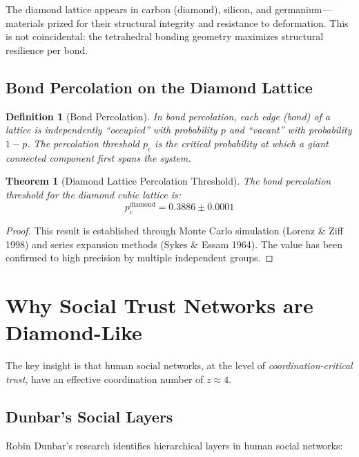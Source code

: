 \documentclass[11pt]{article}
\newtheorem{theorem}{Theorem}
\newtheorem{definition}{Definition}
\begin{document}
The diamond lattice appears in carbon (diamond), silicon, and germanium---materials prized for their structural integrity and resistance to deformation. This is not coincidental: the tetrahedral bonding geometry maximizes structural resilience per bond.

\subsection{Bond Percolation on the Diamond Lattice}

\begin{definition}[Bond Percolation]
In bond percolation, each edge (bond) of a lattice is independently ``occupied'' with probability $p$ and ``vacant'' with probability $1-p$. The percolation threshold $p_c$ is the critical probability at which a giant connected component first spans the system.
\end{definition}

\begin{theorem}[Diamond Lattice Percolation Threshold]
The bond percolation threshold for the diamond cubic lattice is:
\begin{equation}
\boxed{p_c^{\text{diamond}} = 0.3886 \pm 0.0001}
\end{equation}
\end{theorem}

\begin{proof}
This result is established through Monte Carlo simulation (Lorenz \& Ziff 1998) and series expansion methods (Sykes \& Essam 1964). The value has been confirmed to high precision by multiple independent groups.
\end{proof}

\section{Why Social Trust Networks are Diamond-Like}

The key insight is that human social networks, at the level of \emph{coordination-critical trust}, have an effective coordination number of $z \approx 4$.

\subsection{Dunbar's Social Layers}

Robin Dunbar's research identifies hierarchical layers in human social networks:
\end{document}
